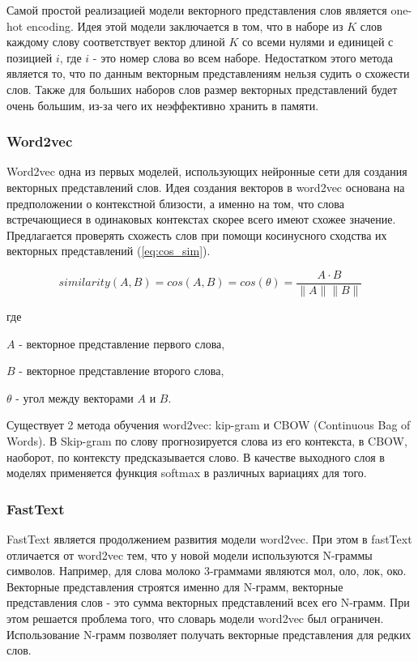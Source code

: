 \documentclass[a4paper,14pt]{article}
\begin{document}
	Самой простой реализацией модели векторного представления слов является one-hot encoding.
	Идея этой модели заключается в том, что в наборе из $K$ слов каждому слову соответствует вектор длиной $K$ со всеми нулями и единицей с позицией $i$, где $i$ - это номер слова во всем наборе.
	Недостатком этого метода является то, что по данным векторным представлениям нельзя судить о схожести слов.
	Также для больших наборов слов размер векторных представлений будет очень большим, из-за чего их неэффективно хранить в памяти.
	
	\subsubsection{Word2vec}
	
	Word2vec \cite{word2vec} одна из первых моделей, использующих нейронные сети для создания векторных представлений слов.
	Идея создания векторов в word2vec основана на предположении о контекстной близости, а именно на том, что слова встречающиеся в одинаковых контекстах скорее всего имеют схожее значение.
	Предлагается проверять схожесть слов при помощи косинусного сходства их векторных представлений (\ref{eq:cos_sim}).
	
	\begin{equation}
		similarity(A,B) = cos(A,B) = cos(\theta) = \dfrac{A\cdot B}{\|A\| \|B\|}
		\label{eq:cos_sim}
	\end{equation}

	где
	
	$A$ - векторное представление первого слова,
	
	$B$ - векторное представление второго слова,
	
	$\theta$ - угол между векторами $A$ и $B$.
	
	Существует 2 метода обучения word2vec: kip-gram и CBOW (Continuous Bag of Words).
	В Skip-gram по слову прогнозируется слова из его контекста, в CBOW, наоборот, по контексту предсказывается слово.
	В качестве выходного слоя в моделях применяется функция softmax в различных вариациях для того.
		
	\subsubsection{FastText}
	
	FastText является продолжением развития модели word2vec.
	При этом в fastText отличается от word2vec тем, что у новой модели используются N-граммы символов.
	Например, для слова молоко 3-граммами являются мол, оло, лок, око.
	Векторные представления строятся именно для N-грамм, векторные представления слов - это сумма векторных представлений всех его N-грамм.
	При этом решается проблема того, что словарь модели word2vec был ограничен.
	Использование N-грамм позволяет получать векторные представления для редких слов.
	
\end{document}
